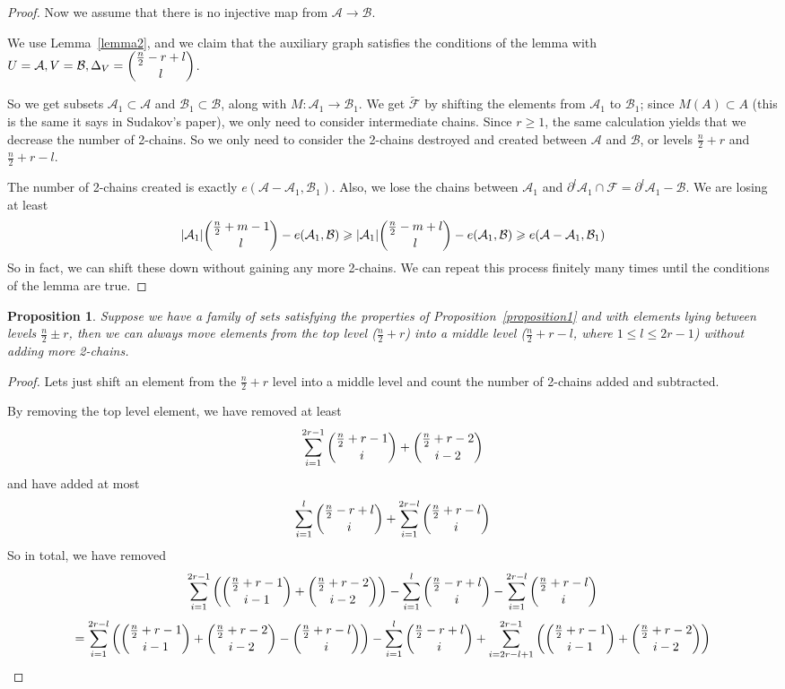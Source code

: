 \documentclass[12pt]{article}
\theoremstyle{plain}
\newtheorem{proposition}[theorem]{Proposition}
\theoremstyle{definition}
\theoremstyle{remark}
\newcommand{\F}{\mathcal{F}}
\newcommand{\A}{\mathcal{A}}
\newcommand{\B}{\mathcal{B}}
\begin{document}
\begin{proof}
Now we assume that there is no injective map from $\A \rightarrow \B$.

We use Lemma~\ref{lemma2}, and we claim that the auxiliary graph satisfies the conditions of the lemma with $U = \A, V = \B, \Delta_V = \dbinom{\frac{n}{2} - r + l}{l}$.

So we get subsets $\A_1 \subset \A$ and $\B_1 \subset \B$, along with $M:\A_1 \rightarrow \B_1$. We get $\tilde{\F}$ by shifting the elements from $\A_1$ to $\B_1$; since $M(A) \subset A$ (this is the same it says in Sudakov's paper), we only need to consider intermediate chains. Since $r \geq 1$, the same calculation yields that we decrease the number of 2-chains. So we only need to consider the 2-chains destroyed and created between $\A$ and $\B$, or levels $\frac{n}{2} + r$ and $\frac{n}{2} + r - l$.

The number of 2-chains created is exactly $e(\A - \A_1, \B_1)$. Also, we lose the chains between $\A_1$ and $\partial^l\A_1 \cap \F = \partial^l\A_1 - \B$. We are losing at least
\[ |\A_1|\dbinom{\frac{n}{2}+m-1}{l} - e(\A_1, \B) \geq |\A_1|\dbinom{\frac{n}{2} - m + l}{l} - e(\A_1, \B) \geq e(\A - \A_1, \B_1) \] 
So in fact, we can shift these down without gaining any more 2-chains. We can repeat this process finitely many times until the conditions of the lemma are true.
\end{proof}

\begin{proposition}
\label{proposition2}
Suppose we have a family of sets satisfying the properties of Proposition~\ref{proposition1} and with elements lying between levels $\frac{n}{2}\pm r$, then we can always move elements from the top level ($\frac{n}{2}+r$) into a middle level ($\frac{n}{2} + r - l$, where $1 \leq l \leq 2r-1$) without adding more 2-chains. 
\end{proposition}

\begin{proof}
Lets just shift an element from the $\frac{n}{2} + r$ level into a middle level and count the number of 2-chains added and subtracted. 

By removing the top level element, we have removed at least
\[ \sum_{i=1}^{2r-1} \dbinom{\frac{n}{2} +r-1}{i} + \dbinom{\frac{n}{2} + r-2}{i-2} \]
and have added at most
\[ \sum_{i=1}^l \dbinom{\frac{n}{2}-r+l}{i} + \sum_{i=1}^{2r-l} \dbinom{\frac{n}{2}+r-l}{i} \]
So in total, we have removed 
\[ \sum_{i=1}^{2r-1} \left(\dbinom{\frac{n}{2} +r-1}{i-1} + \dbinom{\frac{n}{2} + r-2}{i-2}\right) - \sum_{i=1}^l \dbinom{\frac{n}{2}-r+l}{i} - \sum_{i=1}^{2r-l} \dbinom{\frac{n}{2}+r-l}{i}\]
\[ = \sum_{i=1}^{2r-l} \left(\dbinom{\frac{n}{2}+r-1}{i-1} + \dbinom{\frac{n}{2}+r-2}{i-2} - \dbinom{\frac{n}{2} + r - l}{i} \right) - \sum_{i=1}^l \dbinom{\frac{n}{2}-r+l}{i} + \sum_{i=2r-l+1}^{2r-1} \left(\dbinom{\frac{n}{2}+r-1}{i-1} + \dbinom{\frac{n}{2}+r-2}{i-2} \right)\]

\end{proof}
\end{document}
